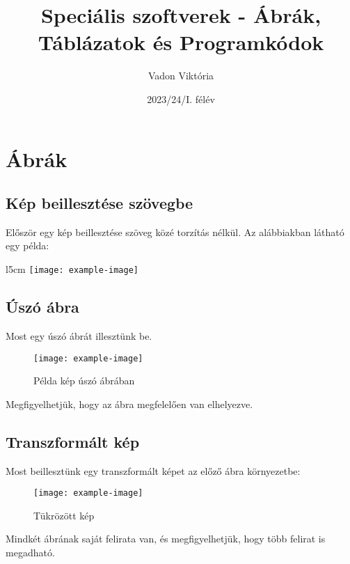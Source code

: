 \documentclass[12pt]{article}
\begin{document}
\title{Speciális szoftverek - Ábrák, Táblázatok és Programkódok}
\author{Vadon Viktória}
\date{2023/24/I. félév}
\maketitle

\tableofcontents
\listoffigures
\listoftables

\section{Ábrák}

\subsection{Kép beillesztése szövegbe}
Először egy kép beillesztése szöveg közé torzítás nélkül. Az alábbiakban látható egy példa:

\hulipsum[1]

\begin{wrapfigure}{l}{5cm}
    \texttt{[image: example-image]}
\end{wrapfigure}

\hulipsum[2]

\subsection{Úszó ábra}
Most egy úszó ábrát illesztünk be.

\begin{figure}[h]
    \centering
    \texttt{[image: example-image]}
    \caption{Példa kép úszó ábrában}
    \label{fig:float1}
\end{figure}

Megfigyelhetjük, hogy az ábra megfelelően van elhelyezve.

\subsection{Transzformált kép}
Most beillesztünk egy transzformált képet az előző ábra környezetbe:

\begin{figure}[h]
    \centering
    \texttt{[image: example-image]}
    \caption{Tükrözött kép}
    \label{fig:transformed}
\end{figure}

Mindkét ábrának saját felirata van, és megfigyelhetjük, hogy több felirat is megadható.
\end{document}
